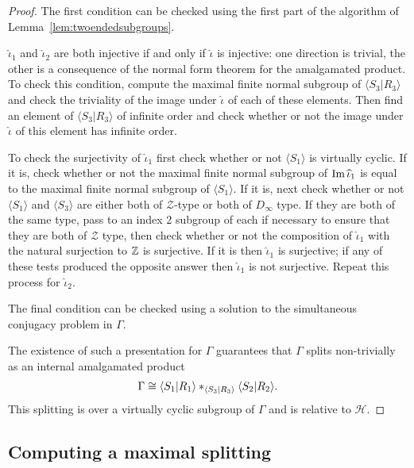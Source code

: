 \begin{proof}
The first condition can be checked using the first part of the algorithm of
Lemma~\ref{lem:twoendedsubgroups}.

$\widehat\iota_1$ and $\widehat\iota_2$ are both injective if and only if $\widehat\iota$
is injective: one direction is trivial, the other is a consequence of the
normal form theorem for the amalgamated product. To check this condition,
compute the maximal finite normal subgroup of $\langle S_3\vert R_3\rangle$ and
check the triviality of the image under $\widehat\iota$ of each of these elements.
Then find an element of $\langle S_3\vert R_3\rangle$ of infinite order and
check whether or not the image under $\widehat\iota$ of this element has infinite
order.

To check the surjectivity of $\widehat\iota_1$ first check whether or not $\langle
S_1 \rangle$ is virtually cyclic. If it is, check whether or not the maximal finite
normal subgroup of $\operatorname{\mathrm{Im}}\widehat\iota_1$ is equal to the maximal finite normal
subgroup of $\langle S_1 \rangle$. If it is, next check whether or not $\langle
S_1 \rangle$ and $\langle S_3 \rangle$ are either both of $\mathcal{Z}$-type or
both of $D_\infty$ type. If they are both of the same type, pass to an index 2
subgroup of each if necessary to ensure that they are both of $\mathcal{Z}$
type, then check whether or not the composition of $\widehat\iota_1$ with the
natural surjection to $\mathbb{Z}$ is surjective. If it is then $\widehat\iota_1$ is
surjective; if any of these tests produced the opposite answer then
$\widehat\iota_1$ is not surjective. Repeat this process for $\widehat\iota_2$.

The final condition can be checked using a solution to the simultaneous
conjugacy problem in $\Gamma$.

The existence of such a presentation for $\Gamma$ guarantees that $\Gamma$
splits non-trivially as an internal amalgamated product 
\begin{align*}
  \Gamma \cong \langle S_1 \vert R_1 \rangle \ast_{\langle S_3 \vert R_3
    \rangle} \langle S_2 \vert R_2 \rangle.
\end{align*}
This splitting is over a virtually cyclic
subgroup of $\Gamma$ and is relative to $\mathcal{H}$. 
\end{proof}

\subsection{Computing a maximal splitting}

